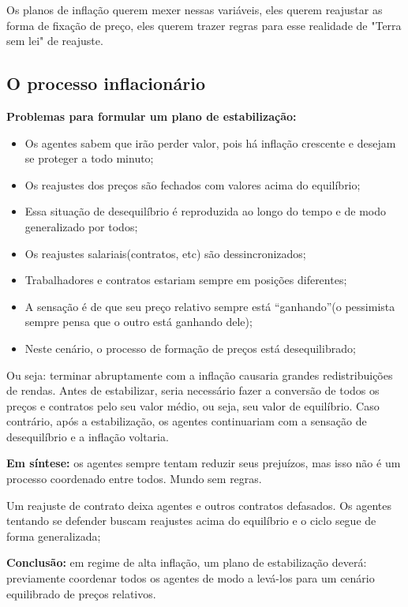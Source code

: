 \documentclass[a4paper,12pt]{article}[abntex2]
\begin{document}
Os planos de inflação querem mexer nessas variáveis, eles querem reajustar as forma de fixação de preço, eles querem trazer regras para esse realidade de "Terra sem lei" de reajuste.

\subsection{\textbf{O processo inflacionário}}

\textbf{Problemas para formular um plano de estabilização:}\begin{itemize}
    \item Os agentes sabem que irão perder valor, pois há inflação crescente e desejam se proteger a todo minuto;
    \item Os reajustes dos preços são fechados com valores acima do equilíbrio;
    \item Essa situação de desequilíbrio é reproduzida ao longo do tempo e de modo generalizado por todos;
    \item Os reajustes salariais(contratos, etc) são dessincronizados;
    \item Trabalhadores e contratos estariam sempre em posições diferentes;
    \item A sensação é de que seu preço relativo sempre está ``ganhando''(o pessimista sempre pensa que o outro está ganhando dele);
    \item Neste cenário, o processo de formação de preços está desequilibrado;
\end{itemize}

Ou seja: terminar abruptamente com a inflação causaria grandes redistribuições de rendas. Antes de estabilizar, seria necessário fazer a conversão de todos os preços e contratos pelo seu valor médio, ou seja, seu valor de equilíbrio. Caso contrário, após a estabilização, os agentes continuariam com a sensação de desequilíbrio e a inflação voltaria.

\textbf{Em síntese:} os agentes sempre tentam reduzir seus prejuízos, mas isso não é um processo coordenado entre todos. Mundo sem regras.

Um reajuste de contrato deixa agentes e outros contratos defasados. Os agentes tentando se defender buscam reajustes acima do equilíbrio e o ciclo segue de forma generalizada;

\textbf{Conclusão:} em regime de alta inflação, um plano de estabilização deverá: previamente coordenar todos os agentes de modo a levá-los para um cenário equilibrado de preços relativos.
\end{document}

